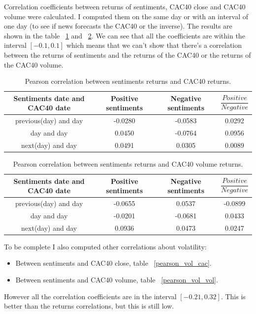 \documentclass[12pt]{report}
\begin{document}
			Correlation coefficients between returns of sentiments, CAC40 close and CAC40 volume were calculated. I computed them on the same day or with an interval of one day (to see if news forecasts the CAC40 or the inverse). The results are shown in the table ~\ref{pearson_cac} and ~\ref{pearson_volume}. We can see that all the coefficients are within the interval $[-0.1, 0.1]$ which means that we can't show that there's a correlation between the returns of sentiments and the returns of the CAC40 or the returns of the CAC40 volume.
			
			\begin{table}
			\begin{tabular}{|c | c | c | c|}
				\hline
				Sentiments date and CAC40 date & Positive sentiments & Negative sentiments & $\dfrac{Positive}{Negative}$\\
				\hline
				previous(day) and day & -0.0280 & -0.0583 & 0.0292\\
				\hline
				day and day & 0.0450 & -0.0764 & 0.0956\\
				\hline
				next(day) and day & 0.0491 & 0.0305 & 0.0089\\
				\hline
			\end{tabular}
			
			\caption{Pearson correlation between sentiments returns and CAC40 returns.\label{pearson_cac}}
			\end{table}

			\begin{table}
			\begin{tabular}{|c | c | c | c|}
				\hline
				Sentiments date and CAC40 date & Positive sentiments & Negative sentiments & $\dfrac{Positive}{Negative}$\\
				\hline
				previous(day) and day & -0.0655 & 0.0537 & -0.0899\\
				\hline
				day and day & -0.0201 & -0.0681 & 0.0433\\
				\hline
				next(day) and day & 0.0936 & 0.0473 & 0.0247\\
				\hline
			\end{tabular}
			
			\caption{Pearson correlation between sentiments returns and CAC40 volume returns.\label{pearson_volume}}
			\end{table}

		To be complete I also computed other correlations about volatility:
			\begin{itemize}
				\item Between sentiments and CAC40 close, table ~\ref{pearson_vol_cac}.
				\item Between sentiments and CAC40 volume, table ~\ref{pearson_vol_vol}.
			\end{itemize}
			However all the correlation coefficients are in the interval $[-0.21, 0.32]$. This is better than the returns correlations, but this is still low.
\end{document}
